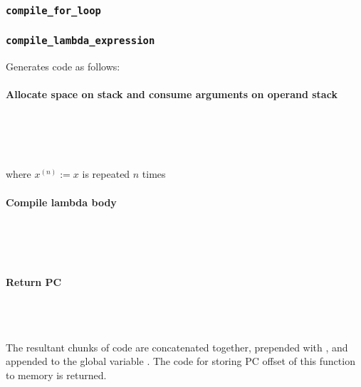 \subsubsection{\texttt{compile\_for\_loop}}

\subsubsection{\texttt{compile\_lambda\_expression}}
Generates code as follows: \\\\
\textbf{Allocate space on stack and consume arguments on operand stack}\\\\
\begin{prooftree}
\end{prooftree}\\\\\\
where $x^{(n)}:=x$ is repeated $n$ times\\\\
\textbf{Compile lambda body}\\\\
\begin{prooftree}
\end{prooftree}\\\\\\
\textbf{Return PC}\\\\
\begin{prooftree}
\end{prooftree}\\\\
The resultant chunks of code are concatenated together, prepended with , and appended to the global variable . The code for storing PC offset of this function to memory is returned.  

